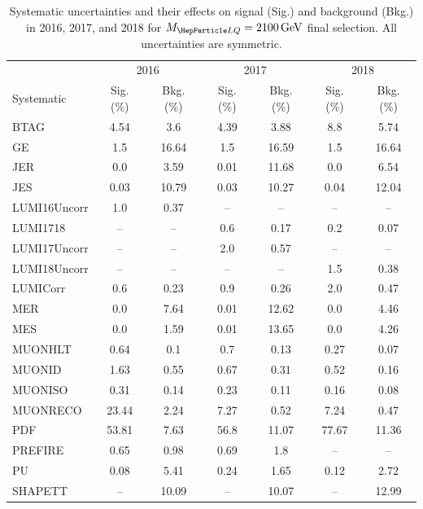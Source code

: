 \begin{table}[H]
	\begin{center}
        \begin{footnotesize}
			\caption{Systematic uncertainties and their effects on signal (Sig.) and background (Bkg.) in 2016, 2017, and 2018 for $\MLQ = \SI{2100}{GeV}$ final selection. All uncertainties are symmetric.}
			\begin{tabular}{lcccccc} \hline \hline
				& \multicolumn{2}{c}{2016} & \multicolumn{2}{c}{2017} & \multicolumn{2}{c}{2018} \\
				Systematic & Sig. (\%) & Bkg. (\%) & Sig. (\%) & Bkg. (\%) & Sig. (\%) & Bkg. (\%) \\ \hline
				BTAG &  4.54  &  3.6 &  4.39  &  3.88 &  8.8  &  5.74 \\
				GE &  1.5  &  16.64 &  1.5  &  16.59 &  1.5  &  16.64 \\
				JER &  0.0  &  3.59 &  0.01  &  11.68 &  0.0  &  6.54 \\
				JES &  0.03  &  10.79 &  0.03  &  10.27 &  0.04  &  12.04 \\
				LUMI16Uncorr &  1.0  &  0.37 & -- & -- & -- & -- \\
				LUMI1718 & -- & -- &  0.6  &  0.17 &  0.2  &  0.07 \\
				LUMI17Uncorr & -- & -- &  2.0  &  0.57 & -- & -- \\
				LUMI18Uncorr & -- & -- & -- & -- &  1.5  &  0.38 \\
				LUMICorr &  0.6  &  0.23 &  0.9  &  0.26 &  2.0  &  0.47 \\
				MER &  0.0  &  7.64 &  0.01  &  12.62 &  0.0  &  4.46 \\
				MES &  0.0  &  1.59 &  0.01  &  13.65 &  0.0  &  4.26 \\
				MUONHLT &  0.64  &  0.1 &  0.7  &  0.13 &  0.27  &  0.07 \\
				MUONID &  1.63  &  0.55 &  0.67  &  0.31 &  0.52  &  0.16 \\
				MUONISO &  0.31  &  0.14 &  0.23  &  0.11 &  0.16  &  0.08 \\
				MUONRECO &  23.44  &  2.24 &  7.27  &  0.52 &  7.24  &  0.47 \\
				PDF &  53.81  &  7.63 &  56.8  &  11.07 &  77.67  &  11.36 \\
				PREFIRE &  0.65  &  0.98 &  0.69  &  1.8 & -- & -- \\
				PU &  0.08  &  5.41 &  0.24  &  1.65 &  0.12  &  2.72 \\
				SHAPETT & -- &  10.09 & -- &  10.07 & -- &  12.99 \\

\end{tabular}
\end{footnotesize}
\end{center}
\end{table}
